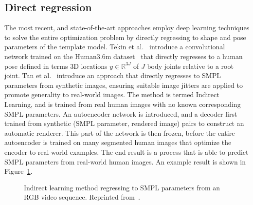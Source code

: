         
\subsection{Direct regression}
The most recent, and state-of-the-art approaches employ deep learning techniques to solve the entire optimization problem by directly regressing to shape and pose parameters of the template model. Tekin et al.~\cite{tekin2016direct} introduce a convolutional network trained on the Human3.6m dataset~\cite{lin2014microsoft} that directly regresses to a human pose defined in terms 3D locations $y \in \mathbb{R}^{3J}$ of $J$ body joints relative to a root joint. Tan et al.~\cite{tan17indirect} introduce an approach that directly regresses to SMPL parameters from synthetic images, ensuring suitable image jitters are applied to promote generality to real-world images. The method is termed Indirect Learning, and is trained from real human images with no known corresponding SMPL parameters. An autoencoder network is introduced, and a decoder first trained from synthetic (SMPL parameter, rendered image) pairs to construct an automatic renderer. This part of the network is then frozen, before the entire autoencoder is trained on many segmented human images that optimize the encoder to real-world examples. The end result is a process that is able to predict SMPL parameters from real-world human images. An example result is shown in Figure~\ref{fig:indirect_learning}.

\begin{figure}[H] %
    \caption{Indirect learning method regressing to SMPL parameters from an RGB video sequence. Reprinted from~\cite{tan17indirect}.}
    \label{fig:indirect_learning}
\end{figure}



